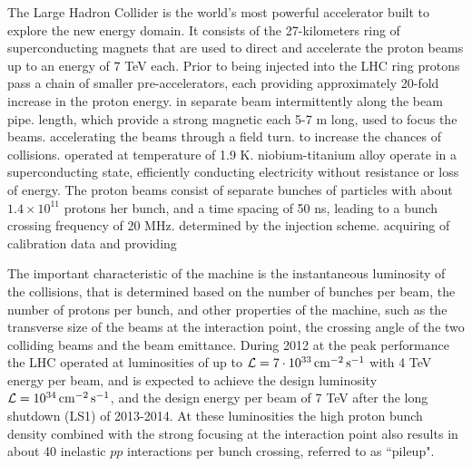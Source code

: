 The Large Hadron Collider is the world's most powerful accelerator built 
to explore the new energy domain.
It consists of the 27-kilometers ring of superconducting magnets that are 
used to direct and accelerate the 
proton beams up to an energy of 7 TeV each. Prior to being injected into 
the LHC ring protons pass a chain of 
smaller pre-accelerators, each providing approximately 20-fold increase in 
the proton energy.
in separate beam 
intermittently along the beam pipe.
length, which provide a strong magnetic 
each 5-7 m long, used to focus the beams. 
accelerating the beams through a field
turn. 
to increase the chances of collisions.
operated at temperature of 1.9 K. 
niobium-titanium alloy operate in a superconducting state, efficiently 
conducting electricity without resistance or loss of energy.
The proton beams consist of separate bunches of particles with about $1.4 
\times 10^{11}$ 
protons her bunch, and a time spacing of 50 ns, leading to a bunch 
crossing frequency of 20 MHz. 
determined by the injection scheme.
acquiring of calibration data and providing

The important characteristic of the machine is the instantaneous 
luminosity of the collisions, that is determined 
based on the number of bunches per beam, the number of protons per bunch, 
and other properties 
of the machine, such as the transverse size of the beams at the 
interaction point, the crossing angle 
of the two colliding beams and the beam emittance.
During 2012 at the peak performance the LHC operated at luminosities of up 
to ${\cal L} = 7 \cdot 10^{33} \,\mathrm{cm}^{-2}\, \mathrm{s}^{-1}$ with 
4 TeV energy per beam, and is expected to achieve the design luminosity 
${\cal L} = 10^{34} \,\mathrm{cm}^{-2} \,\mathrm{s}^{-1}$, and the design 
energy per beam of 7 TeV
after the long shutdown (LS1) of 2013-2014. At these luminosities 
the high proton bunch density combined with the strong focusing at the 
interaction point also results 
in about 40 inelastic $pp$ interactions per bunch crossing, referred to as 
``pileup". 

